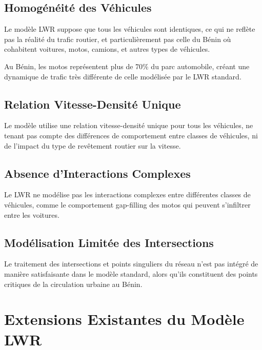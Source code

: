 \subsection{Homogénéité des Véhicules}
\label{subsec:homogeneite}

Le modèle LWR suppose que tous les véhicules sont identiques, ce qui ne reflète pas la réalité du trafic routier, et particulièrement pas celle du Bénin où cohabitent voitures, motos, camions, et autres types de véhicules.

\begin{remark}
Au Bénin, les motos représentent plus de 70\% du parc automobile, créant une dynamique de trafic très différente de celle modélisée par le LWR standard.
\end{remark}

\subsection{Relation Vitesse-Densité Unique}
\label{subsec:relation_unique}

Le modèle utilise une relation vitesse-densité unique pour tous les véhicules, ne tenant pas compte des différences de comportement entre classes de véhicules, ni de l'impact du type de revêtement routier sur la vitesse.

\subsection{Absence d'Interactions Complexes}
\label{subsec:interactions}

Le LWR ne modélise pas les interactions complexes entre différentes classes de véhicules, comme le comportement gap-filling des motos qui peuvent s'infiltrer entre les voitures.

\subsection{Modélisation Limitée des Intersections}
\label{subsec:intersections}

Le traitement des intersections et points singuliers du réseau n'est pas intégré de manière satisfaisante dans le modèle standard, alors qu'ils constituent des points critiques de la circulation urbaine au Bénin.

\section{Extensions Existantes du Modèle LWR}
\label{sec:extensions_existantes}

